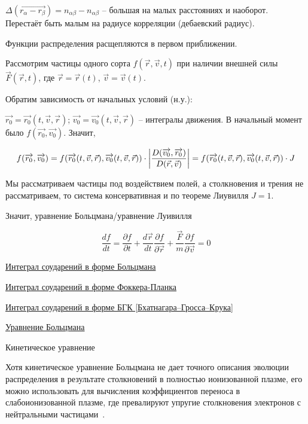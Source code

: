 \documentclass[10pt, a4paper]{article}
\numberwithin{equation}{section}
\begin{document}
$\Delta(\vec{r_\alpha-r_\beta}) = n_{\alpha\beta}-n_{\alpha\beta}$ -- большая на малых расстояниях и наоборот. Перестаёт быть малым на радиусе корреляции (дебаевский радиус).

Функции распределения расщепляются в первом приближении.

Рассмотрим частицы одного сорта $f(\vec{r}, \vec{v}, t)$ при наличии внешней силы $\vec{F}(\vec{r}, t)$, где $\vec{r} = \vec{r}(t)$, $\vec{v} = \vec{v}(t)$.
	
Обратим зависимость от начальных условий (н.у.):

$\vec{r_0} = \vec{r_0}(t, \vec{v}, \vec{r})$; $\vec{v_0} = \vec{v_0}(t, \vec{v}, \vec{r})$ -- интегралы движения. В начальный момент было $f(\overrightarrow{r_0}, \overrightarrow{v_0})$. Значит, 

\begin{equation*}
	f(\overrightarrow{r_0}, \overrightarrow{v_0}) = f(\overrightarrow{r_0}(t, \vec{v}, \vec{r}), \overrightarrow{v_0}(t, \vec{v}, \vec{r})) \cdot \abs{\frac{D(\overrightarrow{v_0}, \overrightarrow{r_0})}{D(\vec{r}, \vec{v})}} =  f(\overrightarrow{r_0}(t, \vec{v}, \vec{r}), \overrightarrow{v_0}(t, \vec{v}, \vec{r})) \cdot J
\end{equation*}
	
Мы рассматриваем частицы под воздействием полей, а столкновения и трения не рассматриваем, то система консервативная и по теореме Лиувилля $J=1$. 

Значит, уравнение Больцмана/уравнение Луивилля

\begin{equation} \label{eq:Boltzmann_eq}
	\frac{df}{dt} = \frac{\partial f}{\partial t} + \frac{d\vec{r}}{dt}\frac{\partial f}{\partial \vec{r}}+ \frac{\vec{F}}{m}\frac{\partial f}{\partial \vec{v}} = 0
\end{equation}
	
\uline{Интеграл соударений в форме Больцмана}

\uline{Интеграл соударений в форме Фоккера-Планка}	
	
\uline{Интеграл соударений в форме БГК [Бхатнагара–Гросса–Крука]}	

\uline{Уравнение Больцмана}

Кинетическое уравнение

Хотя кинетическое уравнение Больцмана не дает точного описания эволюции распределения в результате столкновений в полностью ионизованной плазме, его можно использовать для вычисления коэффициентов переноса
в слабоионизованной плазме, где превалируют упругие столкновения электронов с нейтральными частицами~\cite{kroll}.
\end{document}
